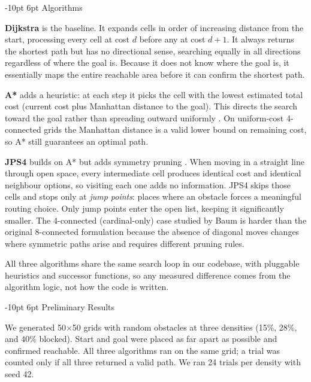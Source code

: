 \documentclass[11pt,twocolumn,a4paper]{article}
\makeatletter
\renewcommand\section{\@startsection{section}{1}{\z@}%
  {-10pt \@plus -2pt \@minus -2pt}%
  {6pt \@plus 2pt}%
  {\normalfont\large\bfseries}}
\makeatother
\begin{document}
\section{Algorithms}

\textbf{Dijkstra} is the baseline. It expands cells in order of increasing
distance from the start, processing every cell at cost $d$ before any at cost
$d{+}1$. It always returns the shortest path but has no directional sense,
searching equally in all directions regardless of where the goal is. Because it
does not know where the goal is, it essentially maps the entire reachable area
before it can confirm the shortest path.

\textbf{A*} adds a heuristic: at each step it picks the cell with the lowest
estimated total cost (current cost plus Manhattan distance to the goal). This
directs the search toward the goal rather than spreading outward uniformly
\cite{hart1968}. On uniform-cost 4-connected grids the Manhattan distance is a
valid lower bound on remaining cost, so A* still guarantees an optimal path.

\textbf{JPS4} builds on A* but adds symmetry pruning \cite{harabor2011,
baum2025}. When moving in a straight line through open space, every intermediate
cell produces identical cost and identical neighbour options, so visiting each
one adds no information. JPS4 skips those cells and stops only at \emph{jump
points}: places where an obstacle forces a meaningful routing choice. Only jump
points enter the open list, keeping it significantly smaller. The 4-connected
(cardinal-only) case studied by Baum \cite{baum2025} is harder than the original
8-connected formulation because the absence of diagonal moves changes where
symmetric paths arise and requires different pruning rules.

All three algorithms share the same search loop in our codebase, with pluggable
heuristics and successor functions, so any measured difference comes from the
algorithm logic, not how the code is written.

\section{Preliminary Results}

We generated 50$\times$50 grids with random obstacles at three densities (15\%,
28\%, and 40\% blocked). Start and goal were placed as far apart as possible and
confirmed reachable. All three algorithms ran on the same grid; a trial was
counted only if all three returned a valid path. We ran 24 trials per density
with seed 42.
\end{document}
